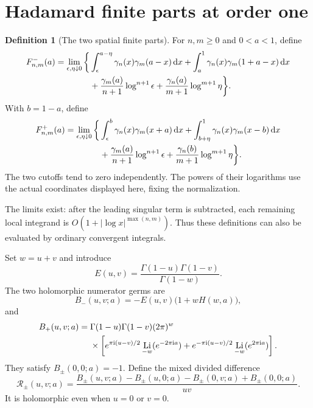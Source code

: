 \documentclass[11pt]{article}
\numberwithin{equation}{section}
\theoremstyle{definition}\newtheorem{definition}[theorem]{Definition}
\theoremstyle{remark}\newtheorem{remark}[theorem]{Remark}
\DeclareMathOperator{\Li}{Li}
\newcommand{\dd}{\,\mathrm d}
\newcommand{\iu}{\mathrm i}
\newcommand{\calR}{\mathcal R}
\begin{document}
\section{Hadamard finite parts at order one}
\label{sec:finiteparts}

\begin{definition}[The two spatial finite parts]\label{def:fp}
For $n,m\ge0$ and $0<a<1$, define
\begin{align}\label{eq:fpminus}
 F^-_{n,m}(a)=\lim_{\epsilon,\eta\downarrow0}
 \bigg\{&\int_{\epsilon}^{a-\eta}
 \gamma_n(x)\gamma_m(a-x)\dd x
 +\int_a^1\gamma_n(x)\gamma_m(1+a-x)\dd x\notag\\
 &+\frac{\gamma_m(a)}{n+1}\log^{n+1}\epsilon
  +\frac{\gamma_n(a)}{m+1}\log^{m+1}\eta\bigg\}.
\end{align}
With $b=1-a$, define
\begin{align}\label{eq:fpplus}
 F^+_{n,m}(a)=\lim_{\epsilon,\eta\downarrow0}
 \bigg\{&\int_{\epsilon}^{b}\gamma_n(x)\gamma_m(x+a)\dd x
 +\int_{b+\eta}^{1}\gamma_n(x)\gamma_m(x-b)\dd x\notag\\
 &+\frac{\gamma_m(a)}{n+1}\log^{n+1}\epsilon
  +\frac{\gamma_n(b)}{m+1}\log^{m+1}\eta\bigg\}.
\end{align}
The two cutoffs tend to zero independently. The powers of their logarithms
use the actual coordinates displayed here, fixing the normalization.
\end{definition}

The limits exist: after the leading singular term is subtracted, each
remaining local integrand is $O(1+|\log x|^{\max(n,m)})$. Thus these
definitions can also be evaluated by ordinary convergent integrals.

Set $w=u+v$ and introduce
\begin{equation}\label{eq:E}
 E(u,v)=\frac{\Gamma(1-u)\Gamma(1-v)}{\Gamma(1-w)}.
\end{equation}
The two holomorphic numerator germs are
\begin{equation}\label{eq:Bminus}
 B_-(u,v;a)=-E(u,v)\bigl(1+wH(w,a)\bigr),
\end{equation}
and
\begin{align}\label{eq:Bplus}
 B_+(u,v;a)={}&\Gamma(1-u)\Gamma(1-v)(2\pi)^w\notag\\
 &\times\left[e^{\pi\iu(u-v)/2}\Li_{-w}(e^{-2\pi\iu a})
              +e^{-\pi\iu(u-v)/2}\Li_{-w}(e^{2\pi\iu a})\right].
\end{align}
They satisfy $B_\pm(0,0;a)=-1$. Define the mixed divided difference
\begin{equation}\label{eq:Rgerm}
 \calR_\pm(u,v;a)=
 \frac{B_\pm(u,v;a)-B_\pm(u,0;a)-B_\pm(0,v;a)+B_\pm(0,0;a)}{uv}.
\end{equation}
It is holomorphic even when $u=0$ or $v=0$.
\end{document}
